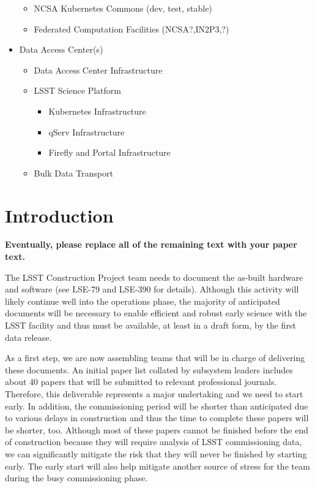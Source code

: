\begin{itemize}
\begin{itemize}
        \item NCSA Kubernetes Commons (dev, test, stable)
        \item Federated Computation Facilities (NCSA?,IN2P3,?)
    \end{itemize}
    \item Data Access Center(s) 
    \begin{itemize}
        \item Data Access Center Infrastructure
        \item LSST Science Platform
        \begin{itemize}
            \item Kubernetes Infrastructure
            \item qServ Infrastructure
            \item Firefly and Portal Infrastructure
        \end{itemize}
        \item Bulk Data Transport
    \end{itemize}
\end{itemize}

\clearpage



\section{Introduction}

{\bf Eventually, please replace all of the remaining text with your paper text.}


The LSST Construction Project team needs to document the as-built hardware and software
(see LSE-79 and LSE-390 for details). Although this activity will likely continue well into the operations phase, the majority 
of anticipated documents will be necessary to enable efficient and robust early science with the LSST 
facility and thus must be available, at least in a draft form, by the first data release. 

As a first step, we are now assembling teams that will be in charge of delivering these documents.
An initial paper list collated by subsystem leaders includes about 40 papers that will be submitted 
to relevant professional journals. Therefore, this deliverable represents a major undertaking
and we need to start early. In addition, the commissioning period will be shorter than anticipated 
due to various delays in construction  and thus the time to complete these papers will be
shorter, too. Although most of these papers cannot be finished before the end of construction 
because they will require analysis of LSST commissioning data, we can significantly mitigate
the risk that they will never be finished by starting early. The early start will also help 
mitigate another source of stress for the team during the busy commissioning phase. 

